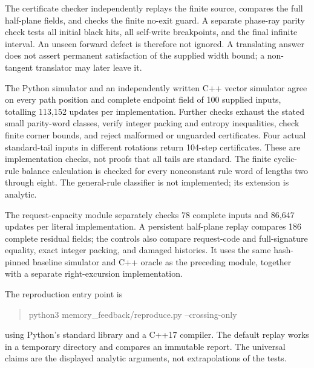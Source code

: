 The certificate checker independently replays the finite source, compares the
full half-plane fields, and checks the finite no-exit guard. A separate phase-ray
parity check tests all initial black hits, all self-write breakpoints, and the
final infinite interval. An unseen forward defect is therefore not ignored.
A translating answer does not assert permanent satisfaction of the supplied
width bound; a non-tangent translator may later leave it.

The Python simulator and an independently written C++ vector simulator agree
on every path position and complete endpoint field of 100 supplied inputs,
totalling 113,152 updates per implementation. Further checks exhaust the
stated small parity-word classes, verify integer packing and entropy inequalities,
check finite corner bounds, and reject malformed or unguarded certificates.
Four actual standard-tail inputs in different rotations return 104-step
certificates. These are implementation checks, not proofs that all tails are
standard. The finite cyclic-rule balance calculation is checked for every
nonconstant rule word of lengths two through eight. The general-rule classifier
is not implemented; its extension is analytic.

The request-capacity module separately checks 78 complete inputs and 86,647
updates per literal implementation. A persistent half-plane replay compares
186 complete residual fields; the controls also compare request-code and
full-signature equality, exact integer packing, and damaged histories.
It uses the same hash-pinned baseline simulator and C++ oracle as the preceding
module, together with a separate right-excursion implementation.

The reproduction entry point is
\begin{quote}\ttfamily
python3 memory\_feedback/reproduce.py --crossing-only
\end{quote}
using Python's standard library and a C++17 compiler. The default replay works
in a temporary directory and compares an immutable report. The universal
claims are the displayed analytic arguments, not extrapolations of the tests.

